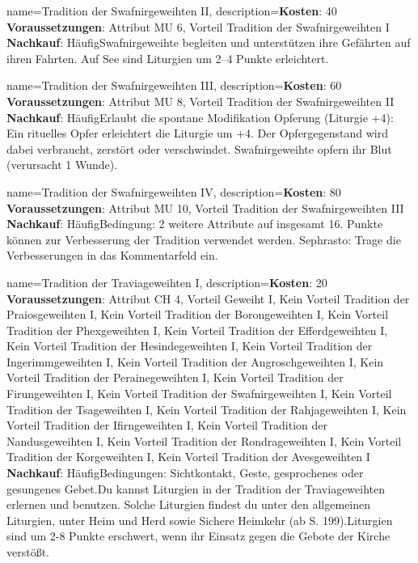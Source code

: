 {
    name={Tradition der Swafnirgeweihten II},
    description={\textbf{Kosten}: 40 \textbf{Voraussetzungen}: Attribut MU 6, Vorteil Tradition der Swafnirgeweihten I \textbf{Nachkauf}: Häufig\newline Swafnirgeweihte begleiten und unterstützen ihre Gefährten auf ihren Fahrten. Auf See sind Liturgien um 2–4 Punkte erleichtert.}
}


{
    name={Tradition der Swafnirgeweihten III},
    description={\textbf{Kosten}: 60 \textbf{Voraussetzungen}: Attribut MU 8, Vorteil Tradition der Swafnirgeweihten II \textbf{Nachkauf}: Häufig\newline Erlaubt die spontane Modifikation Opferung (Liturgie +4): Ein rituelles Opfer erleichtert die Liturgie um +4. Der Opfergegenstand wird dabei verbraucht, zerstört oder verschwindet. Swafnirgeweihte opfern ihr Blut (verursacht 1 Wunde).}
}


{
    name={Tradition der Swafnirgeweihten IV},
    description={\textbf{Kosten}: 80 \textbf{Voraussetzungen}: Attribut MU 10, Vorteil Tradition der Swafnirgeweihten III \textbf{Nachkauf}: Häufig\newline Bedingung: 2 weitere Attribute auf insgesamt 16. Punkte können zur Verbesserung der Tradition verwendet werden. Sephrasto: Trage die Verbesserungen in das Kommentarfeld ein.}
}


{
    name={Tradition der Traviageweihten I},
    description={\textbf{Kosten}: 20 \textbf{Voraussetzungen}: Attribut CH 4, Vorteil Geweiht I, Kein Vorteil Tradition der Praiosgeweihten I, Kein Vorteil Tradition der Borongeweihten I, Kein Vorteil Tradition der Phexgeweihten I, Kein Vorteil Tradition der Efferdgeweihten I, Kein Vorteil Tradition der Hesindegeweihten I, Kein Vorteil Tradition der Ingerimmgeweihten I, Kein Vorteil Tradition der Angroschgeweihten I, Kein Vorteil Tradition der Perainegeweihten I, Kein Vorteil Tradition der Firungeweihten I, Kein Vorteil Tradition der Swafnirgeweihten I, Kein Vorteil Tradition der Tsageweihten I, Kein Vorteil Tradition der Rahjageweihten I, Kein Vorteil Tradition der Ifirngeweihten I, Kein Vorteil Tradition der Nandusgeweihten I, Kein Vorteil Tradition der Rondrageweihten I, Kein Vorteil Tradition der Korgeweihten I, Kein Vorteil Tradition der Avesgeweihten I \textbf{Nachkauf}: Häufig\newline Bedingungen: Sichtkontakt, Geste, gesprochenes oder gesungenes Gebet.\newline Du kannst Liturgien in der Tradition der Traviageweihten erlernen und benutzen. Solche Liturgien findest du unter den allgemeinen Liturgien, unter Heim und Herd sowie Sichere Heimkehr (ab S. 199).\newline Liturgien sind um 2-8 Punkte erschwert, wenn ihr Einsatz gegen die Gebote der Kirche verstößt.}
}


